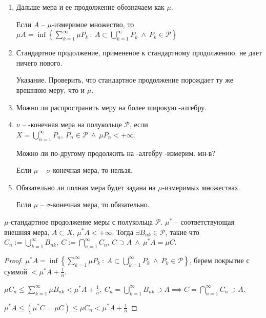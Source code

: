 \begin{remark}
    \begin{enumerate}
        \item {
            Дальше мера и ее продолжение обозначаем как $\mu$.

            Если $A$ -- $\mu$-измеримое множество, то $\mu A = \inf \left\{ \sum_{k=1}^{\infty} \mu P_k \ : \ A \subset \bigcup_{k=1}^{\infty} P_k \ \land \ P_k \in \mathcal{P} \right\}$
        }
        \item {
            Стандартное продолжение, примененое к стандартному продолжению, не дает ничего нового.

            \begin{exerc}
                Указание. Проверить, что стандартное продолжение порождает ту же врешнюю меру, что и $\mu$.
            \end{exerc}
        }
        \item {
            Можно ли распространить меру на более широкую \sigma-алгебру.
        }
        \item {
            \begin{definition}
                $\nu$ -- \sigma-конечная мера на полукольце $\mathcal{P}$, если $X = \bigcup_{n=1}^{\infty}P_n, \ P_n \in \mathcal{P} \ \land \ \mu P_n < +\infty$.
            \end{definition}
            
            Можно ли по-другому продолжить на \sigma-алгебру \mu-измерим. мн-в?

            Если $\mu$ -- $\sigma$-конечная мера, то нельзя.
        }
        \item {
            Обязательно ли полная мера будет задана на $\mu$-измеримых множествах.

            Если $\mu$ -- $\sigma$-конечная мера, то обязательно.
        }
    \end{enumerate}
\end{remark}


\begin{theorem}
    $\mu$-стандартное продолжение меры с полукольца $\mathcal{P}$. $\mu^*$ -- соответствующая внешняя мера, $A \subset X$, $\mu^* A < + \infty$. Тогда $\exists B_{nk} \in \mathcal{P}$, такие что $C_{n} := \bigcup_{k=1}^{\infty} B_{nk}, \ C := \bigcap_{n=1}^{\infty} C_n$, $C \supset A \ \land \ \mu^* A = \mu C$.
\end{theorem}
\begin{proof}
    $\mu^* A = \inf \left\{ \sum_{k=1}^{\infty} \mu P_k \ : \ A \subset \bigcup_{k=1}^{\infty} P_k \ \land \ P_k \in \mathcal{P} \right\}$, берем покрытие с суммой $< \mu^* A + \frac{1}{n}$.

    $\mu C_n \leq \sum_{k=1}^{\infty} \mu B_{nk} < \mu^* A + \frac{1}{n}, \ C_n = \bigcup_{k=1}^{\infty} B_{nk} \supset A \implies C = \bigcap_{n=1}^{\infty} C_n \supset A$.

    $\mu^*A \leq (\mu^* C = \mu C) \leq \mu C_n < \mu^* A + \frac{1}{n}$
\end{proof}


